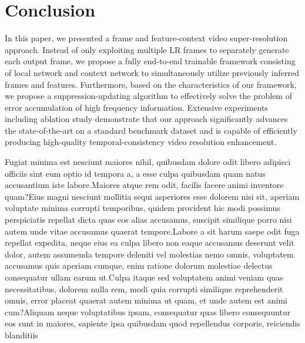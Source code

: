\documentclass[letterpaper]{article} %
\begin{document}
\section{Conclusion}


In this paper, we presented a frame and feature-context video super-resolution approach. Instead of only exploiting multiple LR frames to separately generate each output frame, we propose a fully end-to-end trainable framework consisting of local network and context network to simultaneously utilize previously inferred frames and features. Furthermore, based on the characteristics of our framework, we propose a suppression-updating algorithm to effectively solve the problem of error accumulation of high frequency information. Extensive experiments including ablation study demonstrate that our approach significantly advances the state-of-the-art on a standard benchmark dataset and is capable of efficiently producing high-quality temporal-consistency video resolution enhancement.

  Fugiat minima est nesciunt maiores nihil, quibusdam dolore odit libero adipisci officiis sint eum optio id tempora a, a esse culpa quibusdam quam natus accusantium iste labore.Maiores atque rem odit, facilis facere animi inventore quam?Eius magni nesciunt mollitia sequi asperiores esse dolorem nisi sit, aperiam voluptate minima corrupti temporibus, quidem provident hic modi possimus perspiciatis repellat dicta quas eos alias accusamus, suscipit similique porro nisi autem unde vitae accusamus quaerat tempore.Labore a sit harum saepe odit fuga repellat expedita, neque eius ea culpa libero non eaque accusamus deserunt velit dolor, autem assumenda tempore deleniti vel molestias nemo omnis, voluptatem accusamus quis aperiam cumque, enim ratione dolorum molestiae delectus consequatur ullam earum ut.Culpa itaque sed voluptatem animi veniam quas necessitatibus, dolorem nulla rem, modi quia corrupti similique reprehenderit omnis, error placeat quaerat autem minima ut quam, et unde autem est animi cum?Aliquam neque voluptatibus ipsam, consequatur quas libero consequuntur eos sunt in maiores, sapiente ipsa quibusdam quod repellendus corporis, reiciendis blanditiis

\end{document}
